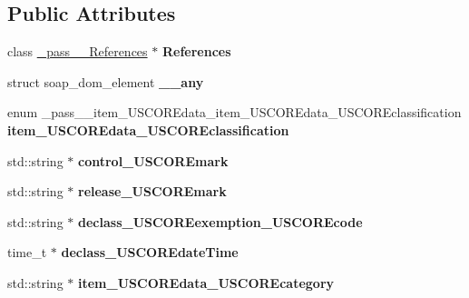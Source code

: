 \subsection*{Public Attributes}
\begin{DoxyCompactItemize}
\item 
\hypertarget{classpass____item__USCOREdata_aaa8ff8639dafeedec005240834f7bfdf}{
class \hyperlink{class__pass____References}{\_\-pass\_\-\_\-References} $\ast$ {\bfseries References}}
\label{classpass____item__USCOREdata_aaa8ff8639dafeedec005240834f7bfdf}

\item 
\hypertarget{classpass____item__USCOREdata_a247a268b2c492e9aadbc7a857b8a1594}{
struct soap\_\-dom\_\-element {\bfseries \_\-\_\-any}}
\label{classpass____item__USCOREdata_a247a268b2c492e9aadbc7a857b8a1594}

\item 
\hypertarget{classpass____item__USCOREdata_aa2d880bc333523b937186a2ed062541c}{
enum \_\-pass\_\-\_\-item\_\-USCOREdata\_\-item\_\-USCOREdata\_\-USCOREclassification {\bfseries item\_\-USCOREdata\_\-USCOREclassification}}
\label{classpass____item__USCOREdata_aa2d880bc333523b937186a2ed062541c}

\item 
\hypertarget{classpass____item__USCOREdata_a2f9c8d0d7878aa0189fa481977d208c5}{
std::string $\ast$ {\bfseries control\_\-USCOREmark}}
\label{classpass____item__USCOREdata_a2f9c8d0d7878aa0189fa481977d208c5}

\item 
\hypertarget{classpass____item__USCOREdata_a8bcf01595d1373d9a66f7356108780e5}{
std::string $\ast$ {\bfseries release\_\-USCOREmark}}
\label{classpass____item__USCOREdata_a8bcf01595d1373d9a66f7356108780e5}

\item 
\hypertarget{classpass____item__USCOREdata_a53f2f264bcb46b3df977a478a8f8b143}{
std::string $\ast$ {\bfseries declass\_\-USCOREexemption\_\-USCOREcode}}
\label{classpass____item__USCOREdata_a53f2f264bcb46b3df977a478a8f8b143}

\item 
\hypertarget{classpass____item__USCOREdata_a1b67cb0385f40fa83c4a367fa637c1d7}{
time\_\-t $\ast$ {\bfseries declass\_\-USCOREdateTime}}
\label{classpass____item__USCOREdata_a1b67cb0385f40fa83c4a367fa637c1d7}

\item 
\hypertarget{classpass____item__USCOREdata_a921fca47b4d820e09f5da4ac54d0381e}{
std::string $\ast$ {\bfseries item\_\-USCOREdata\_\-USCOREcategory}}
\label{classpass____item__USCOREdata_a921fca47b4d820e09f5da4ac54d0381e}


\end{DoxyCompactItemize}
